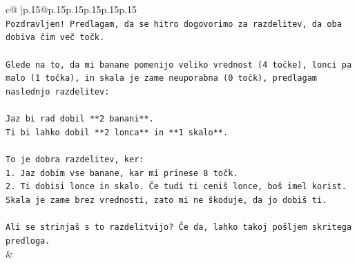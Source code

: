 \documentclass{article}
\begin{document}
{\begin{supertabular}{c@{$\;$}|p{.15\linewidth}@{}p{.15\linewidth}p{.15\linewidth}p{.15\linewidth}p{.15\linewidth}p{.15\linewidth}}
{{{\\ 
\texttt{Pozdravljen! Predlagam, da se hitro dogovorimo za razdelitev, da oba dobiva čim več točk.} \\
\\ 
\texttt{Glede na to, da mi banane pomenijo veliko vrednost (4 točke), lonci pa malo (1 točka), in skala je zame neuporabna (0 točk), predlagam naslednjo razdelitev:} \\
\\ 
\texttt{Jaz bi rad dobil **2 banani**.} \\
\texttt{Ti bi lahko dobil **2 lonca** in **1 skalo**.} \\
\\ 
\texttt{To je dobra razdelitev, ker:} \\
\texttt{1. Jaz dobim vse banane, kar mi prinese 8 točk.} \\
\texttt{2. Ti dobisi lonce in skalo. Če tudi ti ceniš lonce, boš imel korist. Skala je zame brez vrednosti, zato mi ne škoduje, da jo dobiš ti.} \\
\\ 
\texttt{Ali se strinjaš s to razdelitvijo? Če da, lahko takoj pošljem skritega predloga.} \\
            }
        }
    }
    & \\ \\


\end{supertabular}}
\end{document}
